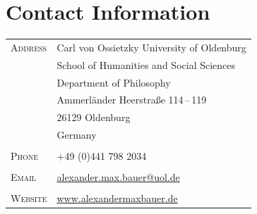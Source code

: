 \documentclass[a4paper,10pt]{article}
\begin{document}
\section{Contact Information}
\begin{longtable}{p{4cm}p{11.5cm}}
   \textsc{Address}     & Carl von Ossietzky University of Oldenburg                             \\
                        & School of Humanities and Social Sciences                               \\
                        & Department of Philosophy                                               \\
                        & Ammerländer Heerstraße 114\,--\,119                                    \\
                        & 26129 Oldenburg                                                        \\
                        & Germany                                                                \\
                        &                                                                        \\
   \textsc{Phone}       & +49 (0)441 798 2034                                                    \\
                        &                                                                        \\
   \textsc{Email}       & \href{mailto:alexander.max.bauer@uol.de}{alexander.max.bauer@uol.de}   \\
                        &                                                                        \\
   \textsc{Website}     & \href{http://www.alexandermaxbauer.de/}{www.alexandermaxbauer.de}      \\
\end{longtable}


\vspace{0.5cm}
\end{document}
